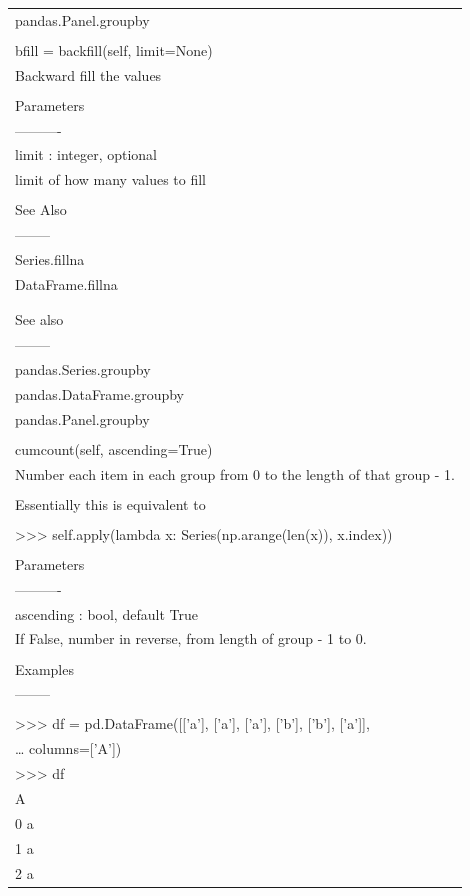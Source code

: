 \documentclass[11pt]{article}
\begin{document}
\begin{enumerate}
\begin{enumerate}
\begin{enumerate}
\begin{center}
\begin{tabular}{l}
pandas.Panel.groupby\\
\\
bfill = backfill(self, limit=None)\\
Backward fill the values\\
\\
Parameters\\
----------\\
limit : integer, optional\\
limit of how many values to fill\\
\\
See Also\\
--------\\
Series.fillna\\
DataFrame.fillna\\
\\
\\
See also\\
--------\\
pandas.Series.groupby\\
pandas.DataFrame.groupby\\
pandas.Panel.groupby\\
\\
cumcount(self, ascending=True)\\
Number each item in each group from 0 to the length of that group - 1.\\
\\
Essentially this is equivalent to\\
\\
>>> self.apply(lambda x: Series(np.arange(len(x)), x.index))\\
\\
Parameters\\
----------\\
ascending : bool, default True\\
If False, number in reverse, from length of group - 1 to 0.\\
\\
Examples\\
--------\\
\\
>>> df = pd.DataFrame([['a'], ['a'], ['a'], ['b'], ['b'], ['a']],\\
\ldots{}                   columns=['A'])\\
>>> df\\
A\\
0  a\\
1  a\\
2  a\\

\end{tabular}
\end{center}
\end{enumerate}
\end{enumerate}
\end{enumerate}
\end{document}
